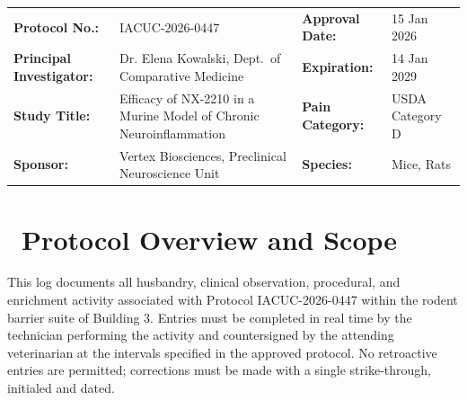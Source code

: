 \documentclass[11pt]{scrreprt}
\begin{document}
\begin{center}
\end{center}
\vspace{0.6cm}

\begin{infobox}
\begin{tabularx}{\textwidth}{@{}l X l X@{}}
\textbf{Protocol No.:} & IACUC-2026-0447 & \textbf{Approval Date:} & 15 Jan 2026 \\
\textbf{Principal Investigator:} & Dr. Elena Kowalski, Dept.\ of Comparative Medicine & \textbf{Expiration:} & 14 Jan 2029 \\
\textbf{Study Title:} & Efficacy of NX-2210 in a Murine Model of Chronic Neuroinflammation & \textbf{Pain Category:} & USDA Category D \\
\textbf{Sponsor:} & Vertex Biosciences, Preclinical Neuroscience Unit & \textbf{Species:} & Mice, Rats \\
\end{tabularx}
\end{infobox}

\vspace{0.4cm}

\section*{\faFile\ Protocol Overview and Scope}

This log documents all husbandry, clinical observation, procedural, and enrichment
activity associated with Protocol IACUC-2026-0447 within the rodent barrier suite of
Building 3. Entries must be completed in real time by the technician performing the
activity and countersigned by the attending veterinarian at the intervals specified in
the approved protocol. No retroactive entries are permitted; corrections must be made
with a single strike-through, initialed and dated.
\end{document}
